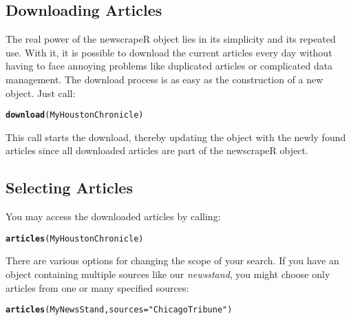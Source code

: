 \documentclass[a4paper,11pt]{article}\usepackage{graphicx, color}
\makeatletter
\newcommand{\hlfunctioncall}[1]{\textcolor[rgb]{0.501960784313725,0,0.329411764705882}{\textbf{#1}}}%
\newcommand{\hlstring}[1]{\textcolor[rgb]{0.6,0.6,1}{#1}}%
\newenvironment{kframe}{%
 \def\at@end@of@kframe{}%
 \ifinner\ifhmode%
  \def\at@end@of@kframe{\end{minipage}}%
  \begin{minipage}{\columnwidth}%
 \fi\fi%
 \def\FrameCommand##1{\hskip\@totalleftmargin \hskip-\fboxsep
 \colorbox{shadecolor}{##1}\hskip-\fboxsep
     \hskip-\linewidth \hskip-\@totalleftmargin \hskip\columnwidth}%
 \MakeFramed {\advance\hsize-\width
   \@totalleftmargin\z@ \linewidth\hsize
   \@setminipage}}%
 {\par\unskip\endMakeFramed%
 \at@end@of@kframe}
\newenvironment{knitrout}{}{} %
\makeatother
\begin{document}
\subsection{Downloading Articles}

The real power of the newscrapeR object lies in its simplicity and its repeated use. With it, it is possible to download the current articles every day without having to face annoying problems like duplicated articles or complicated data management. The download process is as easy as the construction of a new object. Just call:

\begin{knitrout}
\color{fgcolor}\begin{kframe}
\begin{alltt}
\hlfunctioncall{download}(MyHoustonChronicle)
\end{alltt}
\end{kframe}
\end{knitrout}


This call starts the download, thereby updating the object with the newly found articles since all downloaded articles are part of the newscrapeR object.

\subsection{Selecting Articles}

You may access the downloaded articles by calling:

\begin{knitrout}
\color{fgcolor}\begin{kframe}
\begin{alltt}
\hlfunctioncall{articles}(MyHoustonChronicle)
\end{alltt}
\end{kframe}
\end{knitrout}


There are various options for changing the scope of your search. If you have an object containing multiple sources like our \emph{newsstand}, you might choose only articles from one or many specified sources:

\begin{knitrout}
\color{fgcolor}\begin{kframe}
\begin{alltt}
\hlfunctioncall{articles}(MyNewsStand, sources = \hlstring{"Chicago Tribune"})
\end{alltt}
\end{kframe}
\end{knitrout}
\end{document}
